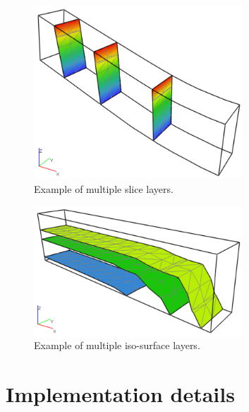 \begin{figure}[H]
    \centering
    \includegraphics[width=0.7\textwidth]{figures/chapter-data-management/beam-slice-layers}
    \decoRule
    \caption{Example of multiple slice layers.}
    \label{fig:beam-slice-layers}
\end{figure}

\begin{figure}[H]
    \centering
    \includegraphics[width=0.7\textwidth]{figures/chapter-data-management/beam-isosurface-layers}
    \decoRule
    \caption{Example of multiple iso-surface layers.}
    \label{fig:beam-isosurface-layers}
\end{figure}


\section{Implementation details}
\label{sec:implementation-details}


